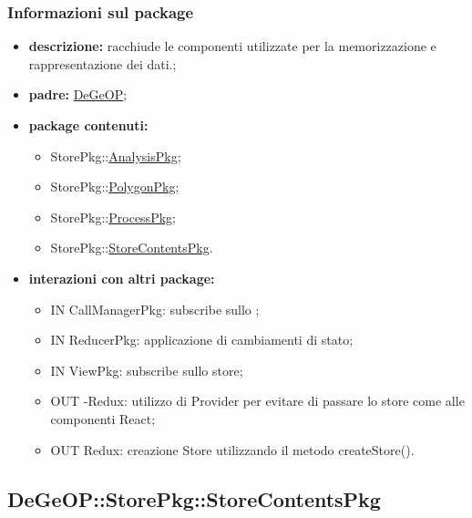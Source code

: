 \subsubsection{Informazioni sul package}
\begin{itemize}
	\item \textbf{descrizione:} racchiude le componenti utilizzate per la memorizzazione e rappresentazione dei dati.;
	\item \textbf{padre:} \hyperref[pkg::DeGeOP]{DeGeOP};
	\item \textbf{package contenuti:}
	\begin{itemize}
		\item StorePkg::\hyperref[pkg::AnalysisPkg]{AnalysisPkg};
		\item StorePkg::\hyperref[pkg::PolygonPkg]{PolygonPkg};
		\item StorePkg::\hyperref[pkg::ProcessPkg]{ProcessPkg};
		\item StorePkg::\hyperref[pkg::StoreContentsPkg]{StoreContentsPkg}.
	\end{itemize}
	\item \textbf{interazioni con altri package:} 
	\begin{itemize}
		\item IN CallManagerPkg: subscribe sullo ;
		\item IN ReducerPkg: applicazione di cambiamenti di stato;
		\item IN ViewPkg: subscribe sullo store;
		\item OUT -Redux: utilizzo di Provider per evitare di passare lo store come  alle componenti React;
		\item OUT Redux: creazione Store utilizzando il metodo createStore().
	\end{itemize}
\end{itemize}
\newpage
\subsection{DeGeOP::StorePkg::StoreContentsPkg}
\label{pkg::StoreContentsPkg}
